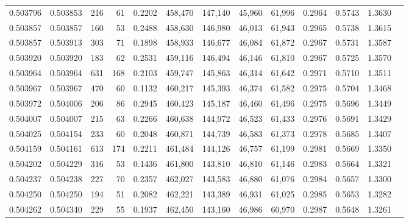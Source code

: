 \begin{tabular}{rrrrrrrrrrrrr}
0.503796 & 0.503853 &   216 &    61 &                                     0.2202 & 458,470 & 147,140 &  45,960 &  61,996 & 0.2964 & 0.5743 & 1.3630 \\
0.503857 & 0.503857 &   160 &    53 &                                     0.2488 & 458,630 & 146,980 &  46,013 &  61,943 & 0.2965 & 0.5738 & 1.3615 \\
0.503857 & 0.503913 &   303 &    71 &                                     0.1898 & 458,933 & 146,677 &  46,084 &  61,872 & 0.2967 & 0.5731 & 1.3587 \\
0.503920 & 0.503920 &   183 &    62 &                                     0.2531 & 459,116 & 146,494 &  46,146 &  61,810 & 0.2967 & 0.5725 & 1.3570 \\
0.503964 & 0.503964 &   631 &   168 &                                     0.2103 & 459,747 & 145,863 &  46,314 &  61,642 & 0.2971 & 0.5710 & 1.3511 \\
0.503967 & 0.503967 &   470 &    60 &                                     0.1132 & 460,217 & 145,393 &  46,374 &  61,582 & 0.2975 & 0.5704 & 1.3468 \\
0.503972 & 0.504006 &   206 &    86 &                                     0.2945 & 460,423 & 145,187 &  46,460 &  61,496 & 0.2975 & 0.5696 & 1.3449 \\
0.504007 & 0.504007 &   215 &    63 &                                     0.2266 & 460,638 & 144,972 &  46,523 &  61,433 & 0.2976 & 0.5691 & 1.3429 \\
0.504025 & 0.504154 &   233 &    60 &                                     0.2048 & 460,871 & 144,739 &  46,583 &  61,373 & 0.2978 & 0.5685 & 1.3407 \\
0.504159 & 0.504161 &   613 &   174 &                                     0.2211 & 461,484 & 144,126 &  46,757 &  61,199 & 0.2981 & 0.5669 & 1.3350 \\
0.504202 & 0.504229 &   316 &    53 &                                     0.1436 & 461,800 & 143,810 &  46,810 &  61,146 & 0.2983 & 0.5664 & 1.3321 \\
0.504237 & 0.504238 &   227 &    70 &                                     0.2357 & 462,027 & 143,583 &  46,880 &  61,076 & 0.2984 & 0.5657 & 1.3300 \\
0.504250 & 0.504250 &   194 &    51 &                                     0.2082 & 462,221 & 143,389 &  46,931 &  61,025 & 0.2985 & 0.5653 & 1.3282 \\
0.504262 & 0.504340 &   229 &    55 &                                     0.1937 & 462,450 & 143,160 &  46,986 &  60,970 & 0.2987 & 0.5648 & 1.3261 \\

\end{tabular}
